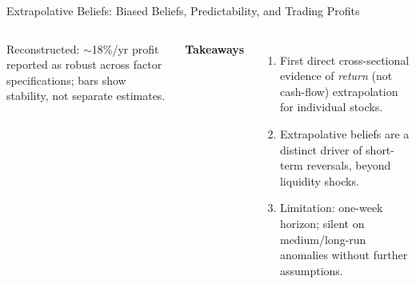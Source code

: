 \documentclass[aspectratio=169, 11pt]{beamer}
\begin{document}
\begin{frame}[shrink=26]{Extrapolative Beliefs: Biased Beliefs, Predictability, and Trading Profits}
\begin{columns}[T]
{\scriptsize Reconstructed: $\sim$18\%/yr profit reported as robust across factor specifications; bars show stability, not separate estimates.}

\vspace{0.8em}
\textbf{Takeaways}
\begin{enumerate}
  \item First direct cross-sectional evidence of \emph{return} (not cash-flow) extrapolation for individual stocks.
  \item Extrapolative beliefs are a distinct driver of short-term reversals, beyond liquidity shocks.
  \item Limitation: one-week horizon; silent on medium/long-run anomalies without further assumptions.
\end{enumerate}
\end{columns}
\end{frame}

\newcommand{\ebf}{\fontsize{4.6}{5.4}\selectfont}

\end{document}
